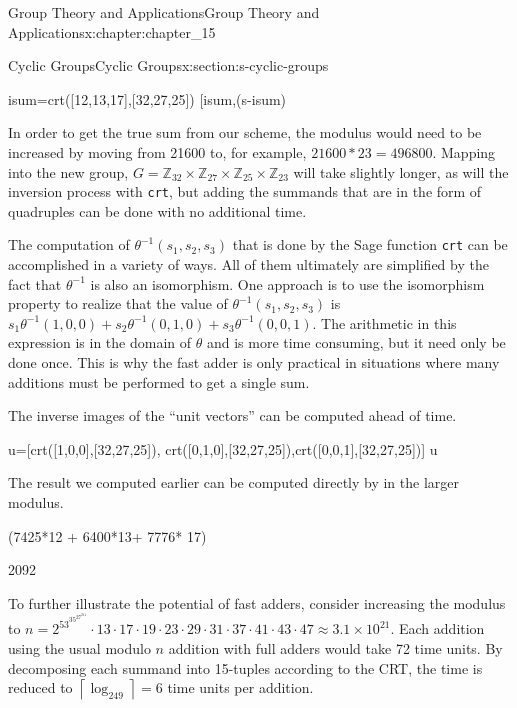 \documentclass[oneside,10pt,]{book}
\newcommand{\mono}[1]{\texttt{#1}}
\numberwithin{equation}{section}
\begin{document}
\begin{chapterptx}{Group Theory and Applications}{}{Group Theory and Applications}{}{}{x:chapter:chapter_15}
\begin{sectionptx}{Cyclic Groups}{}{Cyclic Groups}{}{}{x:section:s-cyclic-groups}
\begin{sageinput}
isum=crt([12,13,17],[32,27,25])
[isum,(s-isum)%
\end{sageinput}
\begin{sageoutput}
[2092, 0]
\end{sageoutput}
In order to get the true sum from our scheme, the modulus would need to be increased by moving from 21600 to, for example,  \(21600*23=496800\).  Mapping into the new group, \(G=\mathbb{Z}_{32}\times \mathbb{Z}_{27}\times \mathbb{Z}_{25}\times \mathbb{Z}_{23}\) will take slightly longer, as will the inversion process with \mono{crt}, but adding the summands that are in the form of quadruples can be done with no additional time.%
\par
The computation of \(\theta^{-1}\left(s_1,s_2,s_3\right)\) that is done by the Sage function \mono{crt} can be accomplished in a variety of ways. All of them ultimately are simplified by the fact that \(\theta^{-1}\) is also an isomorphism. One approach is to use the isomorphism property to realize that the value of \(\theta^{-1}\left(s_1,s_2,s_3\right)\) is \(s_1\theta^{-1}(1,0,0)+s_2\theta^{-1}(0,1,0)+s_3\theta^{-1}(0,0,1)\). The arithmetic in this expression is in the domain of \(\theta\) and is more time consuming, but it need only be done once. This is why the fast adder is only practical in situations where many additions must be performed to get a single sum.%
\par
The inverse images of the ``unit vectors'' can be computed ahead of time.%
\begin{sageinput}
u=[crt([1,0,0],[32,27,25]),
   crt([0,1,0],[32,27,25]),crt([0,0,1],[32,27,25])]
u
\end{sageinput}
\begin{sageoutput}
[7425, 6400, 7776]
\end{sageoutput}
The result we computed earlier  can be computed  directly by in the larger modulus.%
\begin{sageinput}
(7425*12 + 6400*13+ 7776* 17)%
\end{sageinput}
\begin{sageoutput}
2092
\end{sageoutput}
To further illustrate the potential of fast adders, consider increasing the modulus to \(n=2^53^35^27^211\cdot 13\cdot 17\cdot 19\cdot 23\cdot 29\cdot 31\cdot 37\cdot 41\cdot 43\cdot 47\approx 3.1\times 10^{21}\). Each addition using the usual modulo \(n\) addition with full adders would take 72 time units. By decomposing each summand into 15-tuples according to the CRT, the time is reduced to \(\left\lceil \log _249\right\rceil =6\) time units per addition.%

\end{sectionptx}
\end{chapterptx}
\end{document}
